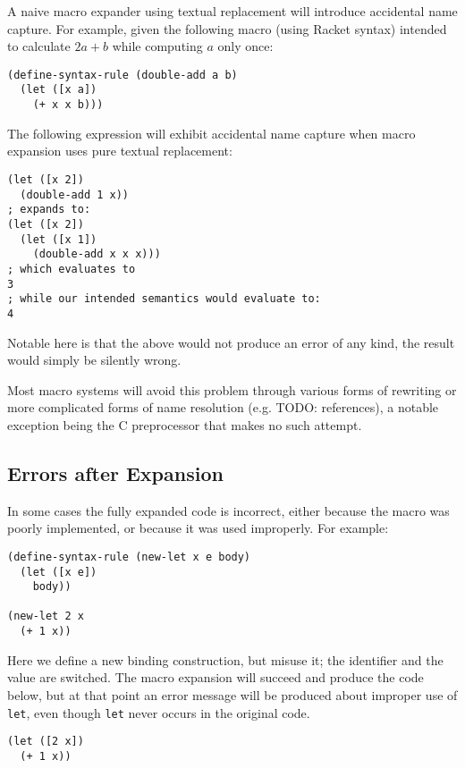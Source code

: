 \documentclass{kththesis}
\begin{document}
A naive macro expander using textual replacement will introduce accidental name capture. For example, given the following macro (using Racket \cite{Flatt2010Reference:-Rack} syntax) intended to calculate $2a + b$ while computing $a$ only once:

\begin{verbatim}
(define-syntax-rule (double-add a b)
  (let ([x a])
    (+ x x b)))
\end{verbatim}

The following expression will exhibit accidental name capture when macro expansion uses pure textual replacement:

\begin{verbatim}
(let ([x 2])
  (double-add 1 x))
; expands to:
(let ([x 2])
  (let ([x 1])
    (double-add x x x)))
; which evaluates to
3
; while our intended semantics would evaluate to:
4
\end{verbatim}

Notable here is that the above would not produce an error of any kind, the result would simply be silently wrong.

Most macro systems will avoid this problem through various forms of rewriting or more complicated forms of name resolution (e.g. \cite{Flatt2016Binding-As-Sets} TODO: references), a notable exception being the C preprocessor that makes no such attempt.

\subsection{Errors after Expansion}

In some cases the fully expanded code is incorrect, either because the macro was poorly implemented, or because it was used improperly. For example:

\begin{verbatim}
(define-syntax-rule (new-let x e body)
  (let ([x e])
    body))

(new-let 2 x
  (+ 1 x))
\end{verbatim}

Here we define a new binding construction, but misuse it; the identifier and the value are switched. The macro expansion will succeed and produce the code below, but at that point an error message will be produced about improper use of \texttt{let}, even though \texttt{let} never occurs in the original code.

\begin{verbatim}
(let ([2 x])
  (+ 1 x))
\end{verbatim}
\end{document}
